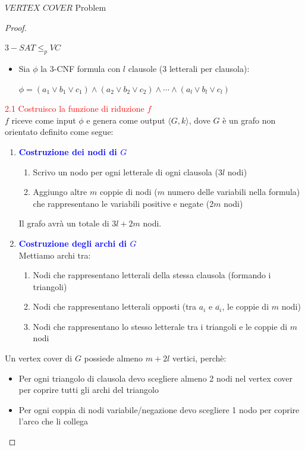 \documentclass{article}  %
\theoremstyle{definition}
\begin{document}
\begin{theorem}{$VERTEX$ $COVER$ Problem}
\begin{proof}
\begin{center}
			$3-SAT \leq_p VC$
		\end{center}
		\begin{itemize}
			\item Sia $\phi$ la 3-CNF formula con $l$ clausole (3 letterali per clausola):
			      \begin{center}
				      $\phi = (a_1 \lor b_1 \lor c_1) \land (a_2 \lor b_2 \lor c_2) \land \cdots \land (a_l \lor b_l \lor c_l)$
			      \end{center}
		\end{itemize}
		\textcolor{red}{2.1 Costruisco la funzione di riduzione $f$} \\
		$f$ riceve come input $\phi$ e genera come output $\langle G,k \rangle$, dove $G$ è un grafo non orientato definito come segue:
		\begin{enumerate}
			\item \textcolor{blue}{\textbf{Costruzione dei nodi di $G$}}
			      \begin{enumerate}
				      \item Scrivo un nodo per ogni letterale di ogni clausola (3$l$ nodi)
				      \item Aggiungo altre $m$ coppie di nodi ($m$ numero delle variabili nella formula) che rappresentano le variabili positive e negate (2$m$ nodi)
			      \end{enumerate}
			      Il grafo avrà un totale di $3l+2m$ nodi.
			\item \textcolor{blue}{\textbf{Costruzione degli archi di $G$}} \\
			      Mettiamo archi tra:
			      \begin{enumerate}
				      \item Nodi che rappresentano letterali della stessa clausola (formando i triangoli)
				      \item Nodi che rappresentano letterali opposti (tra $a_i$ e $\overline{a_i}$, le coppie di $m$ nodi)
				      \item Nodi che rappresentano lo stesso letterale tra i triangoli e le coppie di $m$ nodi
			      \end{enumerate}
		\end{enumerate}
		Un vertex cover di $G$ possiede almeno $m+2l$ vertici, perchè:
		\begin{itemize}
			\item Per ogni triangolo di clausola devo scegliere almeno 2 nodi nel vertex cover per coprire tutti gli archi del triangolo
			\item Per ogni coppia di nodi variabile/negazione devo scegliere 1 nodo per coprire l'arco che li collega

\end{itemize}
\end{proof}
\end{theorem}
\end{document}
